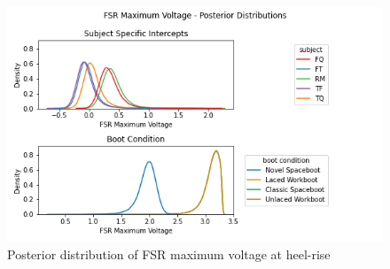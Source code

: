 \documentclass[defaultstyle,11pt]{thesis}
\begin{document}
\begin{figure}
\centering
\includegraphics{../fig/Appendix/FSR Maximum Voltage_posterior.png}
\caption{Posterior distribution of FSR maximum voltage at heel-rise}
\end{figure}





%

\end{document}
